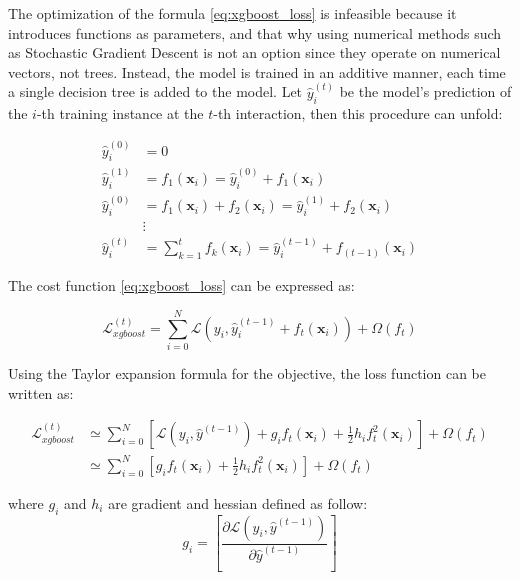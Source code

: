 The optimization of the formula \ref{eq:xgboost_loss} is infeasible because it introduces functions as parameters, and that why using numerical methods such as Stochastic Gradient Descent is not an option since they operate on numerical vectors, not trees. Instead, the model is trained in an additive manner, each time a single decision tree is added to the model. Let $\hat{y}_{i}^{(t)}$ be the model's prediction of the $i$-th training instance at the $t$-th interaction, then this procedure can unfold:        

\begin{equation}
\begin{split}
    \hat{y}_{i}^{(0)} &= 0  \\
    \hat{y}_{i}^{(1)} &= f_{1}(\textbf{x}_i) = \hat{y}_{i}^{(0)} +  f_{1}(\textbf{x}_i)  \\
    \hat{y}_{i}^{(0)} &= f_{1}(\textbf{x}_i) + f_{2}(\textbf{x}_i) = \hat{y}_{i}^{(1)} +  f_{2}(\textbf{x}_i)   \\
    & \vdots   \\ 
    \hat{y}_{i}^{(t)} &=  \sum_{k=1}^{t}f_{k}(\textbf{x}_i) =  \hat{y}_{i}^{(t-1)} + f_{(t-1)}(\textbf{x}_i)
\end{split}
\end{equation}

The cost function \ref{eq:xgboost_loss} can be expressed as:

\begin{equation}
   \mathcal{L}_{xgboost}^{(t)} = \sum_{i=0}^{N}  \mathcal{L}(y_i,  \hat{y}_{i}^{(t-1)} + f_{t}(\mathbf{x}_i)) + \Omega(f_{t})
\end{equation}
 
Using the Taylor expansion formula for the objective, the loss function can be written as:

\begin{equation}
\begin{split}
   \mathcal{L}_{xgboost}^{(t)} &\simeq \sum_{i=0}^{N} \left[ 
   \mathcal{L}(y_i, \hat{y}^{(t-1)}) + g_i f_t(\mathbf{x}_i) + \frac{1}{2}h_if_{t}^{2}(\mathbf{x}_i)  
   \right] + \Omega(f_{t}) \\
    &\simeq \sum_{i=0}^{N} \left[ 
 g_i f_t(\mathbf{x}_i) + \frac{1}{2}h_if_{t}^{2}(\mathbf{x}_i)  
   \right] + \Omega(f_{t})
   \end{split}
   \label{eq:xgboost_taylor}
\end{equation}

where $g_i$ and $h_i$ are gradient and hessian defined as follow:  
\begin{equation}
    g_i = \left[\frac{\partial \mathcal{L}(y_{i},\hat{y}^{(t-1)})}{\partial \hat{y}^{(t-1)}} \right]
\end{equation}

